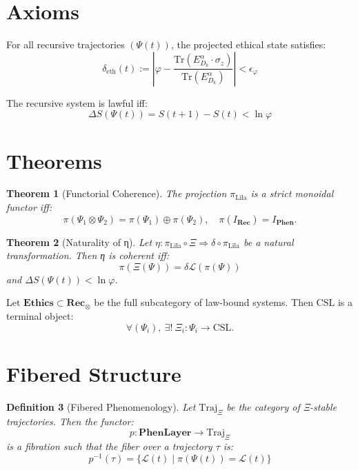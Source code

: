 \documentclass[12]{amsart}
\theoremstyle{plain}
\newtheorem{theorem}{Theorem}[section]
\newtheorem{definition}[theorem]{Definition}
\begin{document}
\section{Axioms}

\begin{axiom}
For all recursive trajectories $(\Psi(t))$, the projected ethical state satisfies:
\[
\delta_{\text{eth}}(t) := \left| \varphi - \frac{\text{Tr}(E_{D_k}^\alpha \cdot \sigma_z)}{\text{Tr}(E_{D_k}^\alpha)} \right| < \epsilon_\varphi
\]
\end{axiom}

\begin{axiom}
The recursive system is lawful iff:
\[
\Delta S(\Psi(t)) = S(t+1) - S(t) < \ln \varphi
\]

\end{axiom}

\section{Theorems}

\begin{theorem}[Functorial Coherence]
The projection $\pi_{\text{Līla}}$ is a strict monoidal functor iff:
\[
\pi(\Psi_1 \otimes \Psi_2) = \pi(\Psi_1) \oplus \pi(\Psi_2), \quad \pi(I_{\mathbf{Rec}}) = I_{\mathbf{Phen}}.
\]
\end{theorem}

\begin{theorem}[Naturality of η]
Let $\eta: \pi_{\text{Līla}} \circ \Xi \Rightarrow \delta \circ \pi_{\text{Līla}}$ be a natural transformation. Then η is coherent iff:
\[
\pi(\Xi(\Psi)) = \delta \mathcal{L}(\pi(\Psi))
\]
and $\Delta S(\Psi(t)) < \ln \varphi$.
\end{theorem}

\begin{conjecture}
Let $\mathbf{Ethics} \subset \mathbf{Rec}_\otimes$ be the full subcategory of law-bound systems. Then $\text{CSL}$ is a terminal object:
\[
\forall (\Psi_i),\ \exists!\ \Xi_i: \Psi_i \rightarrow \text{CSL}.
\]
\end{conjecture}

\section{Fibered Structure}

\begin{definition}[Fibered Phenomenology]
Let $\text{Traj}_\Xi$ be the category of Ξ-stable trajectories. Then the functor:
\[
p: \mathbf{PhenLayer} \to \text{Traj}_\Xi
\]
is a fibration such that the fiber over a trajectory $\tau$ is:
\[
p^{-1}(\tau) = \{ \mathcal{L}(t) \mid \pi(\Psi(t)) = \mathcal{L}(t) \}
\]
\end{definition}
\end{document}
